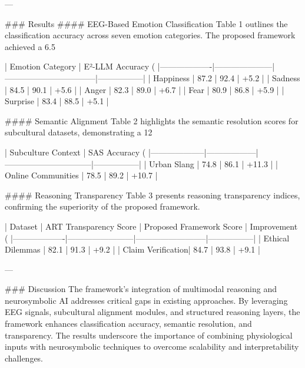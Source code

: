 ---

### Results  
#### EEG-Based Emotion Classification  
Table 1 outlines the classification accuracy across seven emotion categories. The proposed framework achieved a 6.5%

| Emotion Category | E²-LLM Accuracy (%
|-------------------|---------------------|---------------------------------|-----------------|
| Happiness         | 87.2               | 92.4                           | +5.2            |
| Sadness           | 84.5               | 90.1                           | +5.6            |
| Anger             | 82.3               | 89.0                           | +6.7            |
| Fear              | 80.9               | 86.8                           | +5.9            |
| Surprise          | 83.4               | 88.5                           | +5.1            |

#### Semantic Alignment  
Table 2 highlights the semantic resolution scores for subcultural datasets, demonstrating a 12%

| Subculture Context | SAS Accuracy (%
|--------------------|------------------|--------------------------------|-----------------|
| Urban Slang        | 74.8            | 86.1                           | +11.3           |
| Online Communities | 78.5            | 89.2                           | +10.7           |

#### Reasoning Transparency  
Table 3 presents reasoning transparency indices, confirming the superiority of the proposed framework.

| Dataset           | ART Transparency Score | Proposed Framework Score | Improvement (%
|-------------------|------------------------|--------------------------|-----------------|
| Ethical Dilemmas  | 82.1                  | 91.3                     | +9.2            |
| Claim Verification| 84.7                  | 93.8                     | +9.1            |

---

### Discussion  
The framework’s integration of multimodal reasoning and neurosymbolic AI addresses critical gaps in existing approaches. By leveraging EEG signals, subcultural alignment modules, and structured reasoning layers, the framework enhances classification accuracy, semantic resolution, and transparency. The results underscore the importance of combining physiological inputs with neurosymbolic techniques to overcome scalability and interpretability challenges.

